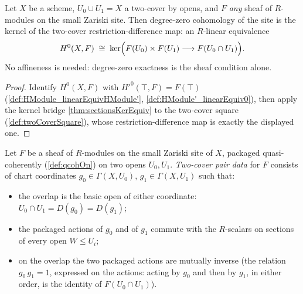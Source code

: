 \begin{theorem}
  \label{thm:twoCoverH0LinearEquiv}
  \leanok
  Let \(X\) be a scheme, \(U_0 \cup U_1 = X\) a two-cover by opens, and \(F\) \emph{any}
  sheaf of \(R\)-modules on the small Zariski site. Then degree-zero cohomology of the
  site is the kernel of the two-cover restriction-difference map: an \(R\)-linear
  equivalence
  \[
    H^0(X, F) \;\cong\;
      \ker\Bigl(F(U_0) \times F(U_1) \longrightarrow F(U_0 \cap U_1)\Bigr).
  \]
  No affineness is needed: degree-zero exactness is the sheaf condition alone.
\end{theorem}
\begin{proof}
  \leanok
  Identify \(H^0(X, F)\) with \(H'^0(\top, F) = F(\top)\)
  (\ref{def:HModule_linearEquivHModule'}, \ref{def:HModule'_linearEquiv0}), then apply
  the kernel bridge \ref{thm:sectionsKerEquiv} to the two-cover square
  (\ref{def:twoCoverSquare}), whose restriction-difference map is exactly the displayed
  one.
\end{proof}

\begin{definition}
  \label{def:twoCoverPairData}
  \leanok
  Let \(F\) be a sheaf of \(R\)-modules on the small Zariski site of \(X\), packaged
  quasi-coherently (\ref{def:qcohOn}) on two opens \(U_0, U_1\). \emph{Two-cover pair
  data} for \(F\) consists of chart coordinates \(g_0 \in \Gamma(X, U_0)\),
  \(g_1 \in \Gamma(X, U_1)\) such that:
  \begin{itemize}
    \item the overlap is the basic open of either coordinate:
      \(U_0 \cap U_1 = D(g_0) = D(g_1)\);
    \item the packaged actions of \(g_0\) and of \(g_1\) commute with the \(R\)-scalars
      on sections of every open \(W \le U_i\);
    \item on the overlap the two packaged actions are mutually inverse (the relation
      \(g_0\, g_1 = 1\), expressed on the actions: acting by \(g_0\) and then by
      \(g_1\), in either order, is the identity of \(F(U_0 \cap U_1)\)).
  \end{itemize}
\end{definition}

